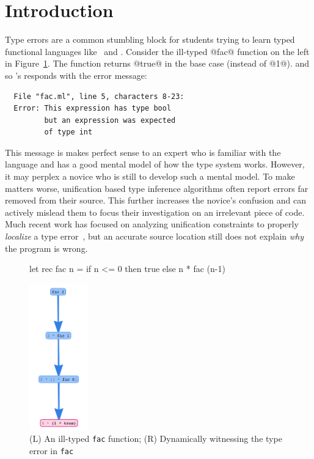 \section{Introduction}
\label{sec:introduction}

Type errors are a common stumbling block for students
trying to learn typed functional languages like \ocaml\
and \haskell.
%
Consider the ill-typed @fac@ function on the left in
Figure~\ref{fig:factorial}.
%
The function returns @true@ in the base case (instead of @1@).
and so \ocaml's responds with the error message:
%
\begin{verbatim}
  File "fac.ml", line 5, characters 8-23:
  Error: This expression has type bool
         but an expression was expected
         of type int
\end{verbatim}

This message is makes perfect sense to an expert who is familiar
with the language and has a good mental model of how the type
system works.
%
However, it may perplex a novice who is still to develop such a
mental model.
%
To make matters worse, unification based type inference algorithms
often report errors far removed from their source.
%
This further increases the novice's confusion and can actively mislead
them to focus their investigation on an irrelevant piece of code.
%
Much recent work has focused on analyzing unification constraints
to properly \emph{localize} a type error~\cite{lerner_searching_2007,chen_counter-factual_2014,zhang_toward_2014,pavlinovic_finding_2014},
but an accurate source location still does not explain \emph{why} the
program is wrong.


\begin{figure}[t]
\centering
\begin{minipage}{.49\linewidth}
\begin{code}
let rec fac n =
  if n <= 0 then
    true
  else
    n * fac (n-1)
\end{code}
\end{minipage}
\hspace{0.3in}
\begin{minipage}{.3\linewidth}
  \includegraphics[height=2.5in]{fac-overview.png}
\end{minipage}
\caption{(L) An ill-typed \texttt{fac} function; (R) Dynamically witnessing the type error in \texttt{fac}}
\label{fig:factorial}
\end{figure}

